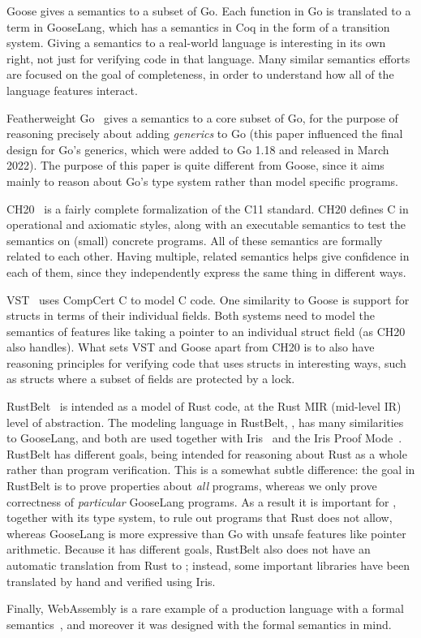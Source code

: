 Goose gives a semantics to a subset of Go. Each function in Go is translated to
a term in GooseLang, which has a semantics in Coq in the form of a transition
system. Giving a semantics to a real-world language is interesting in its own
right, not just for verifying code in that language. Many similar semantics
efforts are focused on the goal of completeness, in order to understand how all
of the language features interact.

Featherweight Go~\cite{griesemer:featherweight-go} gives a semantics to a core
subset of Go, for the purpose of reasoning precisely about adding
\emph{generics} to Go (this paper influenced the final design for Go's generics,
which were added to Go 1.18 and released in March 2022). The purpose of this paper is
quite different from Goose, since it aims mainly to reason about Go's type
system rather than model specific programs.

CH20~\cite{krebbers:c-coq} is a fairly complete formalization of the C11 standard.
CH20 defines C in operational and axiomatic styles, along with an executable
semantics to test the semantics on (small) concrete programs. All of these
semantics are formally related to each other. Having multiple, related semantics
helps give confidence in each of them, since they independently express the same
thing in different ways.

VST~\cite{cao:vst-floyd} uses CompCert C to model C code. One similarity to
Goose is support for structs in terms of their individual fields. Both systems
need to model the semantics of features like taking a pointer to an individual
struct field (as CH20 also handles). What sets VST and Goose apart from CH20 is
to also have reasoning principles for verifying code that uses structs in
interesting ways, such as structs where a subset of fields are protected by a
lock.

RustBelt~\cite{jung:rustbelt} is intended as a model of Rust code, at the Rust
MIR (mid-level IR) level of abstraction. The modeling language in RustBelt,
\lambdarust, has many similarities to GooseLang, and both are used together with
Iris~\cite{jung:iris-1} and the Iris Proof Mode~\cite{krebbers:ipm}. RustBelt
has different goals, being intended for reasoning about Rust as a whole rather
than program verification. This is a somewhat subtle difference: the goal in
RustBelt is to prove properties about \emph{all} \lambdarust programs, whereas
we only prove correctness of \emph{particular} GooseLang programs. As a result
it is important for \lambdarust, together with its type system, to rule out
programs that Rust does not allow, whereas GooseLang is more expressive than Go
with unsafe features like pointer arithmetic. Because it has different goals, RustBelt
also does not have an automatic translation from Rust to \lambdarust; instead,
some important libraries have been translated by hand and verified using Iris.

Finally, WebAssembly is a rare example of a production language with a formal
semantics~\cite{haas:wasm}, and moreover it was designed with the formal
semantics in mind.
